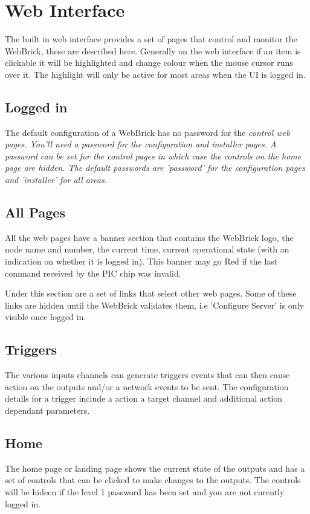 \section{Web Interface}

The built in web interface provides a set of pages that control and monitor the WebBrick, these are described here. 
Generally on the web interface if an item is clickable it will be highlighted and change colour when 
the mouse cursor runs over it. The highlight will only be active for most areas when the UI is logged in.

\subsection{Logged in}

	The default configuration of a WebBrick has no password for the \em{control} web pages.  You'll
	need a password for the configuration and installer pages.  A password can be set for 
        the \em{control} pages in which case the controls on the home page are hidden.  The default passwords
        are 'password' for the configuration pages and 'installer' for all areas.

\subsection{All Pages}
All the web pages have a banner section that contains the WebBrick logo, the node name and number, 
the current time, current operational state (with an indication on whether it is logged in). 
This banner may go Red if the last command received by the PIC chip was invalid.

Under this section are a set of links that select other web pages.  Some of these links are hidden
until the WebBrick validates them, i.e 'Configure Server' is only visible once logged in.

\subsection{Triggers}
The various inputs channels can generate triggers events that can then cause action on the outputs and/or a network
events to be sent. The configuration details for a trigger include a action a target channel  and additional action
dependant parameters.

\subsection{Home}
The home page or landing page shows the current state of the outputs and has a set of controls that can
be clicked to make changes to the outputs. The controls will be hideen if the level 1 password has been
set and you are not curently logged in.

